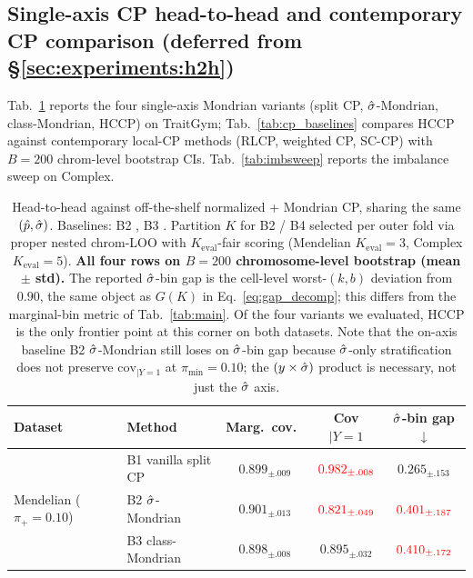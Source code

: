\subsection{Single-axis CP head-to-head and contemporary CP comparison (deferred from \S\ref{sec:experiments:h2h})}
\label{app:tables:h2h}

Tab.~\ref{tab:h2h} reports the four single-axis Mondrian variants (split CP, $\hat{\sigma}$-Mondrian, class-Mondrian, HCCP) on TraitGym; Tab.~\ref{tab:cp_baselines} compares HCCP against contemporary local-CP methods (RLCP, weighted CP, SC-CP) with $B = 200$ chrom-level bootstrap CIs. Tab.~\ref{tab:imbsweep} reports the imbalance sweep on Complex.

\begin{table}[h]
\centering
\footnotesize
\caption{Head-to-head against off-the-shelf normalized + Mondrian CP, sharing the same $(\hat{p}, \hat{\sigma})$. Baselines: B2 \citep{bostrom2020mondrian}, B3 \citep{sadinle2019lac}. Partition $K$ for B2 / B4 selected per outer fold via proper nested chrom-LOO with $K_{\mathrm{eval}}$-fair scoring (Mendelian $K_{\mathrm{eval}} = 3$, Complex $K_{\mathrm{eval}} = 5$). \textbf{All four rows on $B = 200$ chromosome-level bootstrap (mean $\pm$ std).} The reported $\hat{\sigma}$-bin gap is the cell-level worst-$(k,b)$ deviation from $0.90$, the same object as $G(K)$ in Eq.~\eqref{eq:gap_decomp}; this differs from the marginal-bin metric of Tab.~\ref{tab:main}. Of the four variants we evaluated, HCCP is the only frontier point at this corner on both datasets. Note that the on-axis baseline B2 $\hat{\sigma}$-Mondrian still loses on $\hat{\sigma}$-bin gap because $\hat{\sigma}$-only stratification does not preserve $\mathrm{cov}_{|Y=1}$ at $\pi_{\min}=0.10$; the $(y \times \hat{\sigma})$ product is necessary, not just the $\hat{\sigma}$ axis.}
\label{tab:h2h}
\setlength{\tabcolsep}{3pt}
\begin{tabular}{llccc}
\toprule
Dataset & Method & Marg.\ cov.\ & Cov$|Y{=}1$ & $\hat{\sigma}$-bin gap $\downarrow$ \\
\midrule
\multirow{4}{*}{Mendelian ($\pi_{+} = 0.10$)}
 & B1 vanilla split CP            & $0.899_{\pm .009}$ & $\textcolor{red}{0.982_{\pm .008}}$ & $0.265_{\pm .153}$ \\
 & B2 $\hat{\sigma}$-Mondrian            & $0.901_{\pm .013}$ & $\textcolor{red}{0.821_{\pm .049}}$ & $\textcolor{red}{0.401_{\pm .187}}$ \\
 & B3 class-Mondrian              & $0.898_{\pm .008}$ & $0.895_{\pm .032}$                  & $\textcolor{red}{0.410_{\pm .172}}$ \\

\end{tabular}
\end{table}
